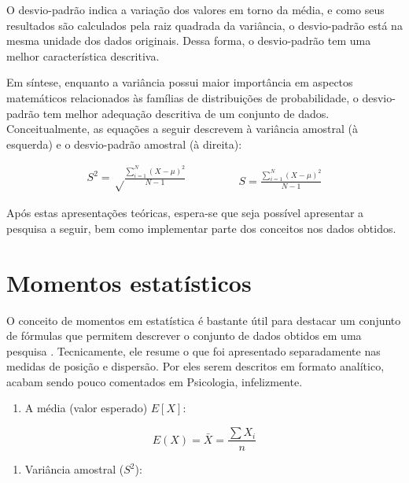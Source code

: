 \documentclass[
]{book}
\providecommand{\tightlist}{%
  \setlength{\itemsep}{0pt}\setlength{\parskip}{0pt}}
\begin{document}
O desvio-padrão indica a variação dos valores em torno da média, e como seus resultados são calculados pela raiz quadrada da variância, o desvio-padrão está na mesma unidade dos dados originais. Dessa forma, o desvio-padrão tem uma melhor característica descritiva.

Em síntese, enquanto a variância possui maior importância em aspectos matemáticos relacionados às famílias de distribuições de probabilidade, o desvio-padrão tem melhor adequação descritiva de um conjunto de dados. Conceitualmente, as equações a seguir descrevem à variância amostral (à esquerda) e o desvio-padrão amostral (à direita):

\begin{equation}
  \begin{split}
    S^2 = \sqrt\frac{\sum\limits_{i=1}^N (X -\mu)^2}{N-1}
  \end{split}
\qquad\qquad
  \begin{split}
    S = \frac{\sum\limits_{i=1}^N (X -\mu)^2}{N-1}
  \end{split}
\end{equation}

Após estas apresentações teóricas, espera-se que seja possível apresentar a pesquisa a seguir, bem como implementar parte dos conceitos nos dados obtidos.

\hypertarget{momentos-estatuxedsticos}{%
\section{Momentos estatísticos}\label{momentos-estatuxedsticos}}

O conceito de momentos em estatística é bastante útil para destacar um conjunto de fórmulas que permitem descrever o conjunto de dados obtidos em uma pesquisa \citep{JenkinsSmith2017}. Tecnicamente, ele resume o que foi apresentado separadamente nas medidas de posição e dispersão. Por eles serem descritos em formato analítico, acabam sendo pouco comentados em Psicologia, infelizmente.

\begin{enumerate}
\def\labelenumi{\arabic{enumi}.}
\tightlist
\item
  A média (valor esperado) \(E[X]\):
\end{enumerate}

\[E(X) = \bar{X}=\frac{\sum X_{i}}{n}\]

\begin{enumerate}
\def\labelenumi{\arabic{enumi}.}
\setcounter{enumi}{1}
\tightlist
\item
  Variância amostral (\(S^2\)):
\end{enumerate}
\end{document}
